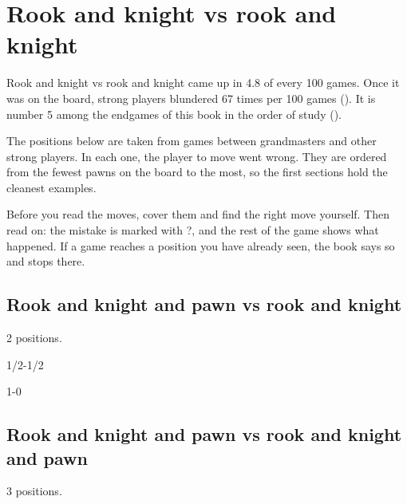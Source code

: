 \chapter{Rook and knight vs rook and knight}\label{ch:rook-and-knight-vs-rook-and-knight}
Rook and knight vs rook and knight came up in 4.8 of every 100 games. Once it was on the board, strong players blundered 67 times per 100 games (). It is number 5 among the endgames of this book in the order of study ().

The positions below are taken from games between grandmasters and other strong players. In each one, the player to move went wrong. They are ordered from the fewest pawns on the board to the most, so the first sections hold the cleanest examples.

Before you read the moves, cover them and find the right move yourself. Then read on: the mistake is marked with ?, and the rest of the game shows what happened. If a game reaches a position you have already seen, the book says so and stops there.


\section{Rook and knight and pawn vs rook and knight}
2 positions.


1/2-1/2\par
{}

1-0\par
\section{Rook and knight and pawn vs rook and knight and pawn}
3 positions.


